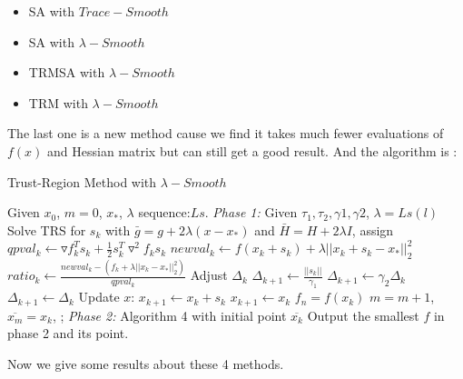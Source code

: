 \documentclass[letterpaper,12pt,titlepage,oneside,final]{book}
\begin{document}
\begin{itemize}

\item SA with $Trace-Smooth$

\item SA with $\lambda-Smooth$

\item TRMSA with $\lambda-Smooth$

\item TRM with $\lambda-Smooth$

\end{itemize} 

The last one is a new method cause we find it takes much fewer evaluations of $f(x)$ and Hessian matrix but can still get a good result. And the algorithm is :

\begin{algorithm} [H]
\caption{Trust-Region Method with $\lambda-Smooth$}
\begin{algorithmic} 
\STATE Given $x_0$, $m=0$, $x_*$, $\lambda$ sequence:$Ls$.
\STATE \emph{Phase 1:}
\STATE Given $\tau_1, \tau_2, \gamma1, \gamma2$, $\lambda=Ls(l)$
\STATE  Solve TRS for $s_k$ with $\bar{g}=g+2\lambda(x-x_*)$ and $\bar{H}=H+2\lambda I$, assign $qpval_k \leftarrow \triangledown  f^T_ks_k+\frac{1}{2}s^T_k \triangledown^2f_ks_k$
\STATE  $newval_k\leftarrow f(x_k+s_k)+\lambda||x_k+s_k-x_*||_2^2$
\STATE  $ratio_k\leftarrow \frac{newval_k-(f_k+\lambda||x_k-x_*||_2^2)}{qpval_k}$
\STATE  Adjust $\Delta_k$
\STATE $\Delta_{k+1}\leftarrow \frac{||s_k||}{\gamma_1}$
\ELSE 
{}
\STATE $\Delta_{k+1}\leftarrow \gamma_2 \Delta_k$
\ELSE 
\STATE $\Delta_{k+1}\leftarrow \Delta_k$
\ENDIF
\ENDIF
\STATE Update $x$:
\STATE $x_{k+1}\leftarrow x_k+s_k$
\ELSE 
\STATE $x_{k+1}\leftarrow x_k$
\ENDIF
\ENDWHILE
\STATE $f_n=f(x_k)$
\STATE $m=m+1$, $\overline{x_m}=x_k$, ;
\ENDIF
\ENDFOR
\STATE  
\STATE \emph{Phase 2:}
\STATE Algorithm 4 with initial point $\overline{x_k}$
\ENDFOR
\STATE Output the smallest $f$ in phase 2 and its point.
\end{algorithmic}
\end{algorithm}

Now we give some results about these 4 methods.
\end{document}
